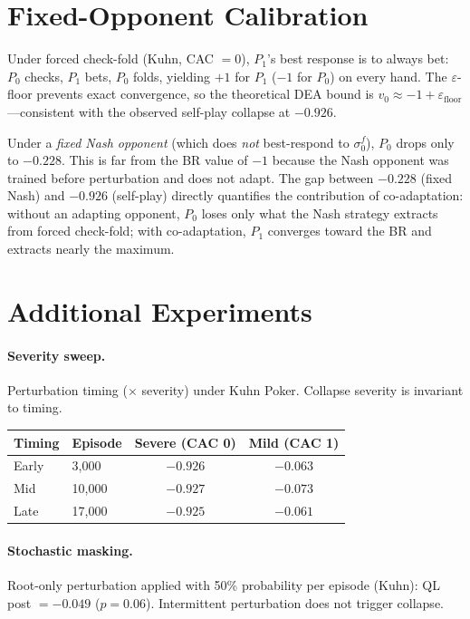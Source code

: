\documentclass{article}
\begin{document}
\section{Fixed-Opponent Calibration}
\label{app:fixed-cal}
Under forced check-fold (Kuhn, CAC $= 0$), $P_1$'s best response is to always bet: $P_0$ checks, $P_1$ bets, $P_0$ folds, yielding $+1$ for $P_1$ ($-1$ for $P_0$) on every hand. The $\varepsilon$-floor prevents exact convergence, so the theoretical DEA bound is $v_0 \approx -1 + \varepsilon_{\text{floor}}$---consistent with the observed self-play collapse at $-0.926$.

Under a \emph{fixed Nash opponent} (which does \emph{not} best-respond to $\sigma_0^f$), $P_0$ drops only to $-0.228$. This is far from the BR value of $-1$ because the Nash opponent was trained before perturbation and does not adapt. The gap between $-0.228$ (fixed Nash) and $-0.926$ (self-play) directly quantifies the contribution of co-adaptation: without an adapting opponent, $P_0$ loses only what the Nash strategy extracts from forced check-fold; with co-adaptation, $P_1$ converges toward the BR and extracts nearly the maximum.

\section{Additional Experiments}
\label{app:algorithms}

\paragraph{Severity sweep.}
Perturbation timing ($\times$ severity) under Kuhn Poker. Collapse severity is invariant to timing.

\begin{center}
\begin{tabular}{llcc}
\toprule
Timing & Episode & Severe (CAC 0) & Mild (CAC 1) \\
\midrule
Early & 3{,}000  & $-0.926$ & $-0.063$ \\
Mid   & 10{,}000 & $-0.927$ & $-0.073$ \\
Late  & 17{,}000 & $-0.925$ & $-0.061$ \\
\bottomrule
\end{tabular}
\end{center}

\paragraph{Stochastic masking.}
Root-only perturbation applied with 50\% probability per episode (Kuhn): QL post $= -0.049$ ($p = 0.06$). Intermittent perturbation does not trigger collapse.
\end{document}
